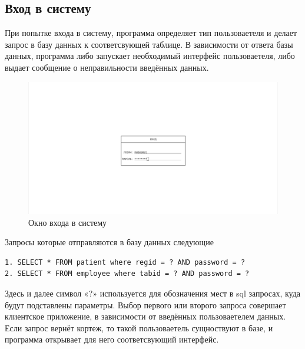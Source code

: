 \documentclass[14pt,a4paper,russian]{extreport}
\begin{document}
\subsection{Вход в систему}
При попытке входа в систему, программа определяет тип пользоваетеля и делает запрос в базу данных к соответсвующей таблице. В зависимости от ответа базы данных, программа либо запускает необходимый интерфейс пользоваетеля, либо выдает сообщение о неправильности введённых данных.
\begin{figure}[t!]
        \includegraphics[width=\textwidth]{prog_int/login-screen}
        \caption{Окно входа в систему}
        \label{fig:login}
\end{figure}
Запросы которые отправляются в базу данных следующие 
\begin{lstlisting}[style=csql] 
1. SELECT * FROM patient where regid = ? AND password = ?
2. SELECT * FROM employee where tabid = ? AND password = ?
\end{lstlisting}
Здесь и далее символ «?» используется для обозначения мест в sql запросах, куда будут подставлены параметры.
Выбор первого или второго запроса совершает клиентское приложение, в зависимости от введённых пользоваетелем данных.
Если запрос вернёт кортеж, то такой пользоваетель сущноствуют в базе, и программа открывает для него соответсвующий интерфейс.
\end{document}
